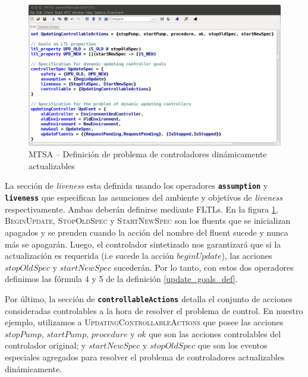 \begin{figure}
    \centering
    \includegraphics[scale=0.35]{img/MTSA_example.png}
    \caption{MTSA -- Definición de problema de controladores dinámicamente actualizables}
    \label{MTSA_example}
\end{figure}

La sección de \emph{liveness} esta definida usando los operadores \texttt{\textbf{assumption}} y
\texttt{\textbf{liveness}} que especifican las asunciones del ambiente y objetivos de \emph{liveness} respectivamente.
Ambas deberán definirse mediante FLTLs. En la figura \ref{MTSA_example}, \textsc{BeginUpdate}, \textsc{StopOldSpec} y
\textsc{StartNewSpec} son los fluents que se inicializan apagados y se prenden cuando la acción del nombre del fluent
sucede y nunca más se apagarán. Luego, el controlador sintetizado nos garantizará que si la actualización es requerida
(i.e sucede la acción $beginUpdate$), las acciones $stopOldSpec$ y $startNewSpec$ sucederán. Por lo tanto,
con estos dos operadores definimos las fórmula 4 y 5 de la definición \ref{update_goals_def}.

Por último, la sección de \texttt{\textbf{controllableActions}} detalla el conjunto de acciones consideradas
controlables a la hora de resolver el problema de control. En nuestro ejemplo, utilizamos a
\textsc{UpdatingControllableActions} que posee las acciones $stopPump$, $startPump$, $procedure$ y $ok$ que son las
acciones controlables del controlador original; y $startNewSpec$ y $stopOldSpec$ que son los eventos especiales
agregados para resolver el problema de controladores actualizables dinámicamente.




